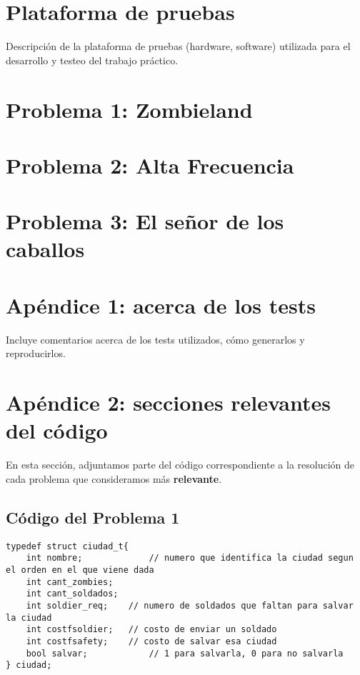 \documentclass[a4paper]{article}
\begin{document}
\newpage
\section{Plataforma de pruebas}

Descripción de la plataforma de pruebas (hardware, software) utilizada
para el desarrollo y testeo del trabajo práctico.


\newpage
\section{Problema 1: Zombieland}


\newpage
\section{Problema 2: Alta Frecuencia}


\newpage
\section{Problema 3: El señor de los caballos}



\newpage
\section{Apéndice 1: acerca de los tests}

Incluye comentarios acerca de los tests utilizados, cómo generarlos y reproducirlos.


\newpage
\section{Apéndice 2: secciones relevantes del código}
En esta sección, adjuntamos parte del código correspondiente a la resolución de cada problema que consideramos más \textbf{relevante}.

\subsection{Código del Problema 1}

\begin{lstlisting}
typedef struct ciudad_t{
	int nombre; 			// numero que identifica la ciudad segun el orden en el que viene dada
    int cant_zombies;
    int cant_soldados;
    int soldier_req;  	// numero de soldados que faltan para salvar la ciudad
    int costfsoldier;  	// costo de enviar un soldado
    int costfsafety;  	// costo de salvar esa ciudad
    bool salvar;			// 1 para salvarla, 0 para no salvarla
} ciudad;
\end{lstlisting}
\end{document}
